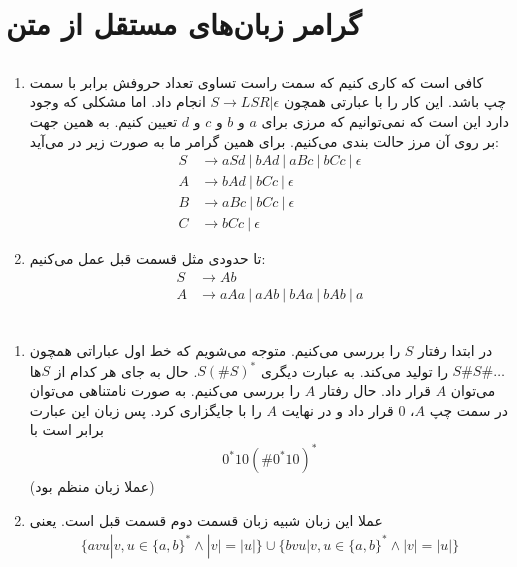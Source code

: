 \section{گرامر زبان‌های مستقل از متن}
\subsection{}
\begin{enumerate}
    \item کافی است که کاری کنیم که سمت راست تساوی تعداد حروفش برابر با سمت چپ باشد. این کار را با
    عبارتی همچون
    $S \rightarrow LSR | \epsilon$
    انجام داد. اما مشکلی که وجود دارد این است که نمی‌توانیم که مرزی برای
    $a$ و $b$
    و
    $c$ و $d$
    تعیین کنیم. به همین جهت بر روی آن مرز حالت بندی می‌کنیم. برای همین گرامر ما به صورت زیر در می‌آید:
    \begin{align*}
        S &\rightarrow aSd ~|~ bAd ~|~ aBc ~|~ bCc ~|~ \epsilon\\
        A &\rightarrow bAd ~|~ bCc ~|~ \epsilon\\
        B &\rightarrow aBc ~|~ bCc ~|~ \epsilon\\
        C &\rightarrow bCc ~|~ \epsilon
    \end{align*}
    \item تا حدودی مثل قسمت قبل عمل می‌کنیم:
    \begin{align*}
        S &\rightarrow Ab\\
        A &\rightarrow aAa ~|~ aAb ~|~ bAa ~|~ bAb ~|~ a\\
    \end{align*}
\end{enumerate}
\subsection{}
\begin{enumerate}
    \item در ابتدا رفتار
    $S$
    را بررسی می‌کنیم. متوجه می‌شویم که خط اول عباراتی همچون
    $S\#S\#\dots$
    را تولید می‌کند. به عبارت دیگری
    $S(\#S)^*$.
    حال به جای هر کدام از
    $S$ها
    می‌توان
    $A$
    قرار داد. حال رفتار
    $A$
    را بررسی می‌کنیم. به صورت نامتناهی می‌توان در سمت چپ
    $A$، 0 قرار داد
    و در نهایت
    $A$
    را با
    جایگزاری کرد. پس زبان این عبارت برابر است با
    \begin{gather*}
        0^*10(\#0^*10)^*
    \end{gather*}
    (عملا زبان منظم بود)
    \item عملا این زبان شبیه زبان قسمت دوم قسمت قبل است. یعنی
    \begin{gather*}
        \{avu | v, u \in \{a, b\}^* \land |v| = |u|\} \cup \{bvu | v, u \in \{a, b\}^* \land |v| = |u|\}
    \end{gather*}
\end{enumerate}
